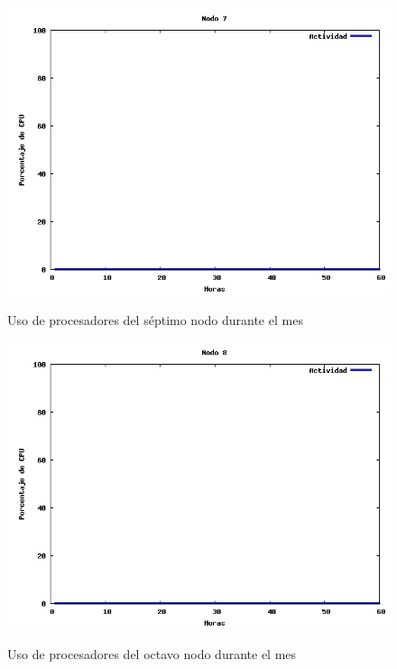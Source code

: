 \documentclass[11pt,a4paper,oneside,openany]{report}
\begin{document}
\begin{figure}[htb]
\centering
\includegraphics[width=0.9\linewidth]{grafico7.jpg}\\
\caption{Uso de procesadores del séptimo nodo durante el mes}
\end{figure}

\begin{figure}[htb]
\centering
\includegraphics[width=0.9\linewidth]{grafico8.jpg}\\
\caption{Uso de procesadores del octavo nodo durante el mes}
\end{figure}
\end{document}
